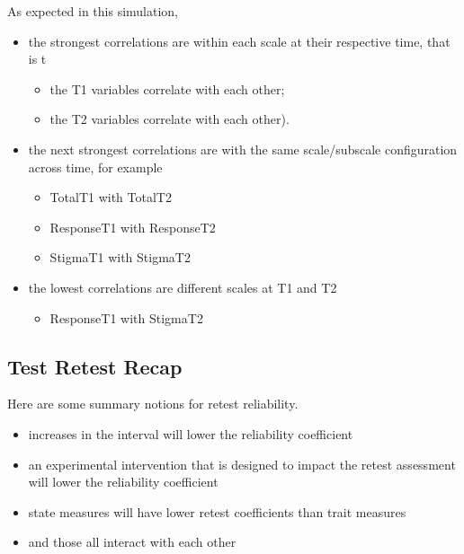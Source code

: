 \documentclass[
  english,
]{book}
\providecommand{\tightlist}{%
  \setlength{\itemsep}{0pt}\setlength{\parskip}{0pt}}
\begin{document}
As expected in this simulation,

\begin{itemize}
\tightlist
\item
  the strongest correlations are within each scale at their respective time, that is t

  \begin{itemize}
  \tightlist
  \item
    the T1 variables correlate with each other;
  \item
    the T2 variables correlate with each other).
  \end{itemize}
\item
  the next strongest correlations are with the same scale/subscale configuration across time, for example

  \begin{itemize}
  \tightlist
  \item
    TotalT1 with TotalT2
  \item
    ResponseT1 with ResponseT2
  \item
    StigmaT1 with StigmaT2
  \end{itemize}
\item
  the lowest correlations are different scales at T1 and T2

  \begin{itemize}
  \tightlist
  \item
    ResponseT1 with StigmaT2
  \end{itemize}
\end{itemize}

\hypertarget{test-retest-recap}{%
\subsection{Test Retest Recap}\label{test-retest-recap}}

Here are some summary notions for retest reliability.

\begin{itemize}
\tightlist
\item
  increases in the interval will lower the reliability coefficient
\item
  an experimental intervention that is designed to impact the retest assessment will lower the reliability coefficient
\item
  state measures will have lower retest coefficients than trait measures
\item
  and those all interact with each other
\end{itemize}
\end{document}
